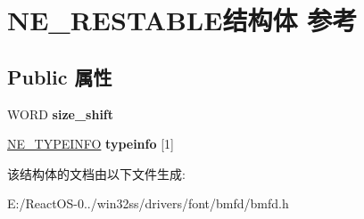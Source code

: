 \hypertarget{struct_n_e___r_e_s_t_a_b_l_e}{}\section{N\+E\+\_\+\+R\+E\+S\+T\+A\+B\+L\+E结构体 参考}
\label{struct_n_e___r_e_s_t_a_b_l_e}
\subsection*{Public 属性}
\begin{DoxyCompactItemize}
\item 
\mbox{\label{struct_n_e___r_e_s_t_a_b_l_e_aff39bf0600ed1cfacfe2704867d9aeeb}} 
W\+O\+RD {\bfseries size\+\_\+shift}
\item 
\mbox{\label{struct_n_e___r_e_s_t_a_b_l_e_a517f6029bd0eb9e48b6fbeeaaf9a306c}} 
\hyperlink{struct_n_e___t_y_p_e_i_n_f_o}{N\+E\+\_\+\+T\+Y\+P\+E\+I\+N\+FO} {\bfseries typeinfo} \mbox{[}1\mbox{]}
\end{DoxyCompactItemize}


该结构体的文档由以下文件生成\+:\begin{DoxyCompactItemize}
\item 
E\+:/\+React\+O\+S-\/0../win32ss/drivers/font/bmfd/bmfd.\+h\end{DoxyCompactItemize}
